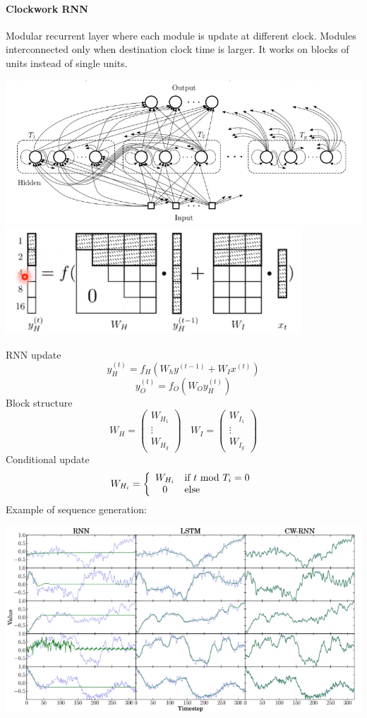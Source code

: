 \documentclass[10pt]{report}
\begin{document}
\paragraph{Clockwork RNN} Modular recurrent layer where each module is update at different clock. Modules interconnected only when destination clock time is larger. It works on blocks of units instead of single units.
\begin{center}
	\includegraphics[scale=0.5]{122.png}\\
	\includegraphics[scale=0.5]{123.png}
\end{center}
RNN update
$$y_H^{(t)} = f_H(W_hy^{(t-1)}+W_Ix^{(t)})$$
$$y_O^{(t)} = f_O(W_Oy_H^{(t)})$$
Block structure $$W_H=\left(\begin{array}{c}
W_{H_1}\\\vdots\\W_{H_g}
\end{array}\right)\:\:\:\:W_I = \left(\begin{array}{c}
W_{I_1}\\\vdots\\W_{I_g}
\end{array}\right)$$
Conditional update $$W_{H_i}=\left\{\begin{array}{c l}
W_{H_i}&\text{if }t\text{ mod }T_i = 0\\
0&\text{else}
\end{array}\right.$$
Example of sequence generation:
\begin{center}
	\includegraphics[scale=0.65]{124.png}
\end{center}
\pagebreak
\end{document}
